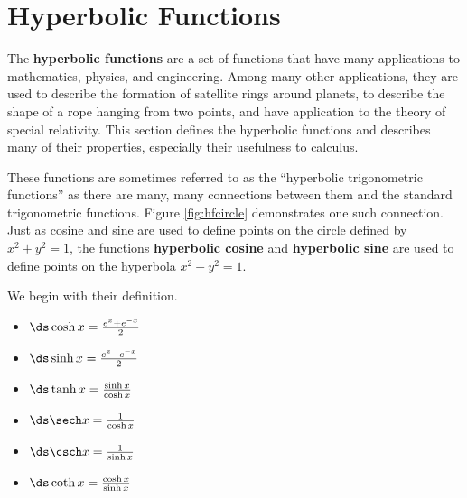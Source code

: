 \section{Hyperbolic Functions}\label{sec:hyperbolic}

The \textbf{hyperbolic functions} are a set of functions that have many applications to mathematics, physics, and engineering. Among many other applications, they are used to describe the formation of satellite rings around planets, to describe the shape of a rope hanging from two points, and have application to the theory of special relativity. This section defines the hyperbolic functions and describes many of their properties, especially their usefulness to calculus.

These functions are sometimes referred to as the ``hyperbolic trigonometric functions'' as there are many, many connections between them and the standard trigonometric functions. Figure \ref{fig:hfcircle} demonstrates one such connection. Just as cosine and sine are used to define points on the circle defined by $x^2+y^2=1$, the functions \textbf{hyperbolic cosine} and \textbf{hyperbolic sine} are used to define points on the hyperbola $x^2-y^2=1$.


We begin with their definition.

{\noindent%
\begin{minipage}{.5\specialboxlength}
\begin{itemize}
\item		$\ds \cosh x = \frac{e^x+e^{-x}}2$
\item		$\ds \sinh x = \frac{e^x-e^{-x}}2$
\item		$\ds \tanh x = \frac{\sinh x}{\cosh x}$
\end{itemize}
\end{minipage}
\begin{minipage}{.5\specialboxlength}
\begin{itemize}
\item		$\ds \sech x = \frac{1}{\cosh x}$
\item		$\ds \csch x = \frac{1}{\sinh x}$
\item		$\ds \coth x = \frac{\cosh x}{\sinh x}$
\end{itemize}
\end{minipage}
}\\

